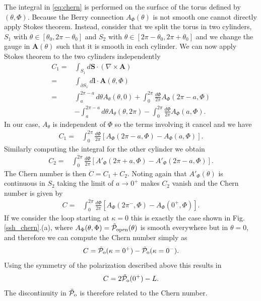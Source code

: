 \documentclass[twocolumn,amsmath,longbibliography,amssymb,superscriptaddress]{revtex4-1}
\newcommand{\tpo}{\tilde{\mathcal{P}}_{\rm o}}
\begin{document}
The integral in \eqref{eq:chern} is performed on the surface of the torus defined by $(\theta,\Phi)$. Because the Berry connection $A_\Phi(\theta)$ is not smooth one cannot directly apply Stokes theorem. Instead, consider that we split the torus in two cylinders, $S_1$ with $\theta\in[\theta_0,2\pi-\theta_0]$ and  $S_2$ with $\theta\in[2\pi-\theta_0,2\pi+\theta_0]$ and we change the gauge in $\boldsymbol{A}(\theta)$ such that it is smooth in each cylinder. We can now apply Stokes theorem to the two cylinders independently
\begin{align}
C_1 =& \int_{S_1} d\boldsymbol{S}\cdot (\nabla \times \boldsymbol{A}) \nonumber\\
=& \int_{\partial S_1} d\boldsymbol{l}\cdot \boldsymbol{A}(\theta,\Phi) \nonumber\\
=& \int_a^{2\pi-a} d\theta A_\theta(\theta,0) +\int_0^{2\pi} \frac{d\Phi}{2\pi} A_\Phi (2\pi-a,\Phi) \nonumber\\
&-\int_a^{2\pi-a} d\theta A_\theta(\theta,2\pi) -\int_0^{2\pi} \frac{d\Phi}{2\pi} A_\Phi (a,\Phi).
\end{align}
In our case, $A_\theta$ is independent of $\Phi$ so the terms involving it cancel and we have
\begin{align}
C_1 =& \int_0^{2\pi} \frac{d\Phi}{2\pi} [A_\Phi (2\pi-a,\Phi) -A_\Phi (a,\Phi)].
\end{align}
Similarly computing the integral for the other cylinder we obtain
\begin{align}
C_2 =& \int_0^{2\pi} \frac{d\Phi}{2\pi} [A'_\Phi (2\pi+a,\Phi) -A'_\Phi (2\pi-a,\Phi)].
\end{align}
The Chern number is then $C=C_1+C_2$. Noting again that $A'_\Phi(\theta)$ is continuous in $S_2$ taking the limit of $a\rightarrow 0^+$ makes $C_2$ vanish and the Chern number is given by
\begin{align}
C =& \int_0^{2\pi} \frac{d\Phi}{2\pi} [A_\Phi (2\pi^-,\Phi) -A_\Phi (0^+,\Phi)].
\end{align}
If we consider the loop starting at $\kappa = 0$ this is exactly the case shown in Fig.\ref{ssh_chern}.(a), where $A_\Phi (\theta,\Phi) = \tilde{\mathcal{P}}_{\rm open}(\theta)$ is smooth everywhere but in $\theta = 0$, and therefore we can compute the Chern number simply as 
\begin{align}
C= \tpo(\kappa=0^+)-\tpo(\kappa=0^-).
\end{align}
Using the symmetry of the polarization described above this results in 
\begin{align}
C= 2\tpo(0^+)-L.
\label{eq:Chern_number}
\end{align}
The discontinuity in $\tpo$ is therefore related to the Chern number.%
\end{document}
